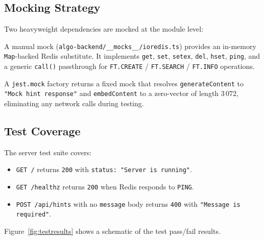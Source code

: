 \documentclass[11pt,a4paper]{article}
\begin{document}
\subsection{Mocking Strategy}

Two heavyweight dependencies are mocked at the module level:

\begin{description}[noitemsep]
  \item[\texttt{ioredis}] A manual mock (\texttt{algo-backend/\_\_mocks\_\_/ioredis.ts})
    provides an in-memory \texttt{Map}-backed Redis substitute.  It implements
    \texttt{get}, \texttt{set}, \texttt{setex}, \texttt{del}, \texttt{hset},
    \texttt{ping}, and a generic \texttt{call()} passthrough for
    \texttt{FT.CREATE} / \texttt{FT.SEARCH} / \texttt{FT.INFO} operations.

  \item[\texttt{@google/generative-ai}] A \texttt{jest.mock} factory returns a
    fixed mock that resolves \texttt{generateContent} to
    \texttt{"Mock hint response"} and \texttt{embedContent} to a zero-vector of
    length 3\,072, eliminating any network calls during testing.
\end{description}

\subsection{Test Coverage}

The server test suite covers:

\begin{itemize}[noitemsep]
  \item \texttt{GET /} returns \texttt{200} with \texttt{status: "Server is running"}.
  \item \texttt{GET /healthz} returns \texttt{200} when Redis responds to
        \texttt{PING}.
  \item \texttt{POST /api/hints} with no \texttt{message} body returns
        \texttt{400} with \texttt{"Message is required"}.
\end{itemize}

Figure~\ref{fig:testresults} shows a schematic of the test pass/fail results.
\end{document}
